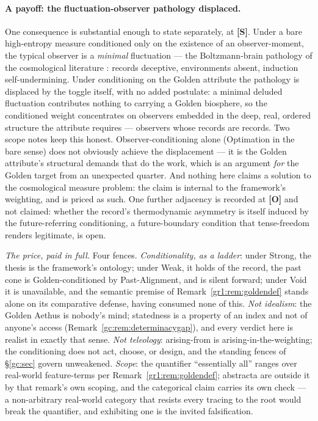 \documentclass[11pt]{article}
\numberwithin{equation}{section}
\theoremstyle{plain}
\theoremstyle{definition}
\theoremstyle{remark}
\begin{document}
\paragraph{A payoff: the fluctuation-observer pathology displaced.}\label{to:rem:boltzbrains}
One consequence is substantial enough to state separately, at
\textbf{[S]}. Under a bare high-entropy measure conditioned only on
the existence of an observer-moment, the typical observer is a
\emph{minimal} fluctuation --- the Boltzmann-brain pathology of the
cosmological literature \cite{AS04,Car17}: records deceptive,
environments absent, induction self-undermining. Under conditioning on
the Golden attribute the pathology is displaced by the toggle itself,
with no added postulate: a minimal deluded fluctuation contributes
nothing to carrying a Golden biosphere, so the conditioned weight
concentrates on observers embedded in the deep, real, ordered
structure the attribute requires --- observers whose records are
records. Two scope notes keep this honest. Observer-conditioning alone
(Optimation in the bare sense) does not obviously achieve the
displacement --- it is the Golden attribute's structural demands that
do the work, which is an argument \emph{for} the Golden target from an
unexpected quarter. And nothing here claims a solution to the
cosmological measure problem: the claim is internal to the framework's
weighting, and is priced as such. One further adjacency is recorded at
\textbf{[O]} and not claimed: whether the record's thermodynamic
asymmetry is itself induced by the future-referring conditioning, a
future-boundary condition that tense-freedom renders legitimate, is
open.

\emph{The price, paid in full.} Four fences. \emph{Conditionality,
as a ladder}: under Strong, the thesis is the framework's ontology;
under Weak, it holds of the record, the past cone is
Golden-conditioned by Past-Alignment, and is silent forward; under
Void it is unavailable, and the semantic premise of
Remark~\ref{gr1:rem:goldendef} stands alone on its comparative
defense, having consumed none of this. \emph{Not idealism}: the
Golden Aethus is nobody's mind; statedness is a property of an index
and not of anyone's access
(Remark~\ref{gc:rem:determinacygap}), and every verdict here is
realist in exactly that sense. \emph{Not teleology}: arising-from is
arising-in-the-weighting; the conditioning does not act, choose, or
design, and the standing fences of \S\ref{gc:sec} govern unweakened.
\emph{Scope}: the quantifier ``essentially all'' ranges over
real-world feature-terms per Remark~\ref{gr1:rem:goldendef};
abstracta are outside it by that remark's own scoping, and the
categorical claim carries its own check --- a non-arbitrary real-world
category that resists every tracing to the root would break the
quantifier, and exhibiting one is the invited falsification.
\end{document}
